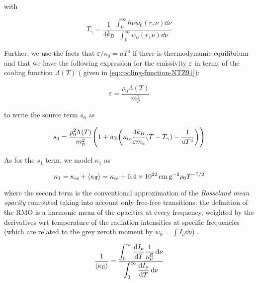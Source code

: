 \documentclass[main.tex]{subfiles}
\begin{document}
with

\begin{equation}
    T_\gamma = \frac{1}{4 k_B} \frac{\displaystyle \int_0^\infty h \nu w_0 (r, \nu) \dd{\nu}}{\displaystyle \int_0^\infty w_0 (r, \nu) \dd{\nu}}
\end{equation}
%

Further, we use the facts that \(\varepsilon / \kappa_0 = a T^4\) if there is thermodynamic equilibrium and that we have the following expression for the emissivity \(\varepsilon\) in terms of the cooling function \(\Lambda (T)\) ( given in \eqref{eq:cooling-function-NTZ91}):

\begin{equation}
    \varepsilon = \frac{\rho_0 \Lambda (T)}{m_p^2}
\end{equation}

to write the source term \(s_0\) as

\begin{equation}
    s_0 = \frac{\rho_0^2 \Lambda (T)}{m_p^2} \qty(1 + w_0 \qty(\kappa_{\text{es}} \frac{4 k_B}{\varepsilon m_e} (T - T_\gamma) - \frac{1}{aT^4}))
\end{equation}

As for the \(s_1\) term, we model \(\kappa_1\) as

\begin{equation}
  \kappa_1 = \kappa_{\text{es}} + \expval{\kappa_{\text{ff}}}
  = \kappa_{\text{es}} + \SI{6.4e22}{\centi\metre\square\per\gram} \rho_0 T^{-7/2}
\end{equation}

where the second term is the conventional approximation of the \emph{Rosseland mean opacity} computed taking into account only free-free transitions: the definition of the RMO is a harmonic mean of the opacities at every frequency, weighted by the derivatives wrt temperature of the radiation intensities at specific frequencies (which are related to the grey zeroth moment by \(w_0 = \int I_\nu \dd{\nu}\)) \cite[eq. 1.110]{Ryb}.

\begin{equation}
  \frac{1}{\expval{\kappa_{\text{ff}}}} =
  \frac{ \displaystyle\int _{0}   ^{\infty}  \dv{I_\nu}{T} \frac{1}{\kappa_\nu^{\text{ff}}} \dd{\nu}}
  {  \displaystyle \int _{0}   ^{\infty} \dv{I_\nu}{T} \dd{\nu}}
\end{equation}
\end{document}
